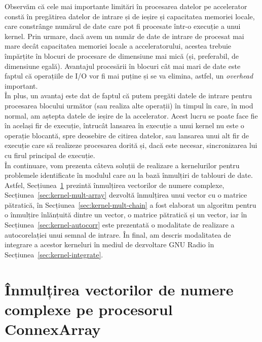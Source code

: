 Observăm că cele mai importante limitări în procesarea datelor pe accelerator
constă în pregătirea datelor de intrare și de ieșire și capacitatea memoriei
locale, care constrânge numărul de date care pot fi procesate într-o execuție a
unui kernel. Prin urmare, dacă avem un număr de date de intrare de procesat mai
mare decât capacitatea memoriei locale a acceleratorului, acestea trebuie
împărțite în blocuri de procesare de dimensiune mai mică (și, preferabil, de
dimensiune egală).  Avantajul procesării
în blocuri cât mai mari de date este faptul că operațiile de I/O vor fi mai
puține și se va elimina, astfel, un \textit{overhead} important. \\

În plus, un avantaj este dat de faptul că putem pregăti datele de intrare pentru
procesarea blocului următor (sau realiza alte operații) în timpul în care, în
mod normal, am aștepta datele de ieșire de la accelerator. Acest lucru se poate
face fie în același fir de execuție, întrucât lansarea în execuție a unui kernel
nu este o operație blocantă, spre deosebire de citirea datelor, sau lansarea
unui alt fir de execuție care să realizeze procesarea dorită și, dacă este
necesar, sincronizarea lui cu firul principal de execuție. \\

În continuare, vom prezenta câteva soluții de realizare a kernelurilor pentru
problemele identificate în modulul  care au la bază înmulțiri de
tablouri de date. Astfel, Secțiunea~\ref{sec:kernel-mult} prezintă înmulțirea
vectorilor de numere complexe, Secțiunea~\ref{sec:kernel-mult-array} dezvoltă
înmulțirea unui vector cu o matrice pătratică, în
Secțiunea~\ref{sec:kernel-mult-chain} a fost elaborat un algoritm pentru o
înmulțire înlănțuită dintre un vector, o matrice pătratică și un vector, iar în
Secțiunea~\ref{sec:kernel-autocorr} este prezentată o modalitate de realizare a
autocorelației unui semnal de intrare. În final, am descris modalitatea de
integrare a acestor kerneluri în mediul de dezvoltare GNU Radio în
Secțiunea~\ref{sec:kernel-integrate}.

\section{Înmulțirea vectorilor de numere complexe pe procesorul ConnexArray}
\label{sec:kernel-mult}

